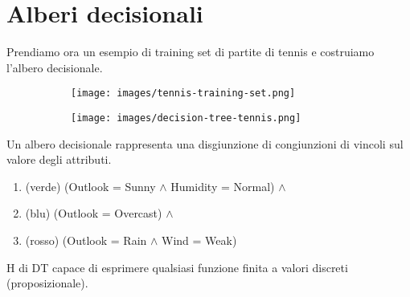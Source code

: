 \newpage
\section{Alberi decisionali}
Prendiamo ora un esempio di training set di partite di tennis e costruiamo l'albero decisionale.
\begin{figure}[h!]
    \centering
    \begin{subfigure}{.45\textwidth}
        \texttt{[image: images/tennis-training-set.png]}
    \end{subfigure}
    \begin{subfigure}{.45\textwidth}
        \texttt{[image: images/decision-tree-tennis.png]}
    \end{subfigure} 
\end{figure}

\hspace{-15pt}Un albero decisionale rappresenta una disgiunzione di congiunzioni di vincoli sul valore
degli attributi.
\begin{enumerate}
    \item (verde) (Outlook = Sunny $\land$ Humidity = Normal) $\land$
    \item (blu) (Outlook = Overcast) $\land$
    \item (rosso) (Outlook = Rain $\land$ Wind = Weak)
\end{enumerate}
H di DT capace di esprimere qualsiasi funzione finita a valori discreti (proposizionale).

